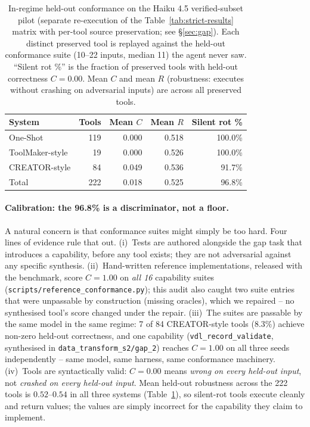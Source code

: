 \documentclass[sigconf,anonymous,natbib=false]{acmart}
\begin{document}
\begin{table}[t]
\centering
\small
\caption{In-regime held-out conformance on the Haiku 4.5 verified-subset pilot (separate re-execution of the Table~\ref{tab:strict-results} matrix with per-tool source preservation; see \S\ref{sec:gap}). Each distinct preserved tool is replayed against the held-out conformance suite (10--22 inputs, median 11) the agent never saw. ``Silent rot \%'' is the fraction of preserved tools with held-out correctness $C{=}0.00$. Mean $C$ and mean $R$ (robustness: executes without crashing on adversarial inputs) are across all preserved tools.}
\label{tab:conformance}
\begin{tabular}{lrrrr}
\toprule
\textbf{System} & \textbf{Tools} & \textbf{Mean $C$} & \textbf{Mean $R$} & \textbf{Silent rot \%} \\
\midrule
One-Shot         & 119 & 0.000 & 0.518 & 100.0\% \\
ToolMaker-style  & 19  & 0.000 & 0.526 & 100.0\% \\
CREATOR-style    & 84  & 0.049 & 0.536 & 91.7\% \\
\midrule
Total            & 222 & 0.018 & 0.525 & 96.8\% \\
\bottomrule
\end{tabular}
\end{table}

\paragraph{Calibration: the 96.8\% is a discriminator, not a floor.}
A natural concern is that conformance suites might simply be too hard. Four lines of evidence rule that out. (i)~Tests are authored alongside the gap task that introduces a capability, before any tool exists; they are not adversarial against any specific synthesis. (ii)~Hand-written reference implementations, released with the benchmark, score $C{=}1.00$ on \emph{all 16} capability suites (\texttt{scripts/reference\_conformance.py}); this audit also caught two suite entries that were unpassable by construction (missing oracles), which we repaired -- no synthesised tool's score changed under the repair. (iii)~The suites are passable by the same model in the same regime: 7 of 84 CREATOR-style tools ($8.3\%$) achieve non-zero held-out correctness, and one capability (\texttt{vdl\_record\_validate}, synthesised in \texttt{data\_transform\_s2/gap\_2}) reaches $C{=}1.00$ on all three seeds independently -- same model, same harness, same conformance machinery. (iv)~Tools are syntactically valid: $C{=}0.00$ means \emph{wrong on every held-out input}, not \emph{crashed on every held-out input}. Mean held-out robustness across the 222 tools is $0.52$--$0.54$ in all three systems (Table~\ref{tab:conformance}), so silent-rot tools execute cleanly and return values; the values are simply incorrect for the capability they claim to implement.
\end{document}
